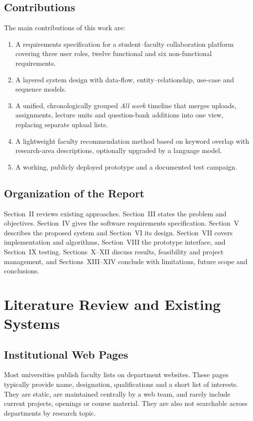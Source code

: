 \documentclass[conference]{IEEEtran}
\begin{document}
\subsection{Contributions}
The main contributions of this work are:
\begin{enumerate}
  \item A requirements specification for a student--faculty collaboration platform covering three user roles, twelve functional and six non-functional requirements.
  \item A layered system design with data-flow, entity--relationship, use-case and sequence models.
  \item A unified, chronologically grouped \emph{All work} timeline that merges uploads, assignments, lecture units and question-bank additions into one view, replacing separate upload lists.
  \item A lightweight faculty recommendation method based on keyword overlap with research-area descriptions, optionally upgraded by a language model.
  \item A working, publicly deployed prototype and a documented test campaign.
\end{enumerate}

\subsection{Organization of the Report}
Section~II reviews existing approaches. Section~III states the problem and objectives. Section~IV gives the software requirements specification. Section~V describes the proposed system and Section~VI its design. Section~VII covers implementation and algorithms, Section~VIII the prototype interface, and Section~IX testing. Sections~X--XII discuss results, feasibility and project management, and Sections~XIII--XIV conclude with limitations, future scope and conclusions.

\section{Literature Review and Existing Systems}

\subsection{Institutional Web Pages}
Most universities publish faculty lists on department websites. These pages typically provide name, designation, qualifications and a short list of interests. They are static, are maintained centrally by a web team, and rarely include current projects, openings or course material. They are also not searchable across departments by research topic.
\end{document}
